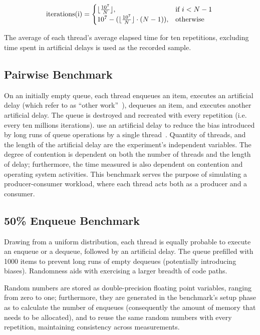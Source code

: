 \[
    \text{iterations(i)} = 
    \begin{cases}
        \lfloor\frac{10^7}{N}\rfloor, & \text{if}~i < N-1 \\
        10^7 - (\lfloor \frac{10^7}{N} \rfloor \cdot (N-1)), & \text{otherwise}
    \end{cases} \\
\]

The average of each thread's average elapsed time for ten repetitions,
excluding time spent in artificial delays is used as the recorded sample.

\subsection{Pairwise Benchmark}

On an initially empty queue, each thread enqueues an item, executes an
artificial delay (which \citeauthor{michael1996simple} refer to as ``other
work''~\citep{michael1996simple}), dequeues an item, and executes another
artificial delay. The queue is destroyed and recreated with every repetition
(i.e. every ten millions iterations). \citeauthor{michael1996simple} use an
artificial delay to reduce the bias introduced by long runs of queue operations
by a single thread~\citep{michael1996simple}. Quantity of threads, and the length
of the artificial delay are the experiment's independent variables.
The degree of contention is dependent on both the number of threads and the length
of delay; furthermore, the time measured is also dependent on
contention and operating system activities. This benchmark serves the purpose
of simulating a producer-consumer workload, where each thread acts both as a
producer and a consumer.

\subsection{50\% Enqueue Benchmark}
Drawing from a uniform distribution, each thread is equally probable to execute
an enqueue or a dequeue, followed by an artificial delay. The queue prefilled
with 1000 items to prevent long runs of empty dequeues (potentially introducing
biases). Randomness aids with exercising a larger breadth of code paths.

Random numbers are stored as double-precision floating point variables, ranging
from zero to one; furthermore, they are generated in the benchmark's setup
phase as to calculate the number of enqueues (consequently the
amount of memory that needs to be allocated), and to reuse the same random
numbers with every repetition, maintaining consistency across measurements. 

